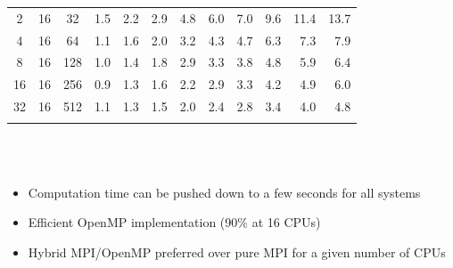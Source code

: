 \begin{frame}
\begin{table}
\begin{tabular}{cccrrrrrrrrr}
	  2& 16& 32	&  1.5 	&  2.2 	&  2.9 	&  4.8  &  6.0  &  7.0  &  9.6  & 11.4  & 13.7  \\
	  4& 16& 64	&  1.1 	&  1.6 	&  2.0 	&  3.2  &  4.3  &  4.7  &  6.3  &  7.3  &  7.9  \\
	  8& 16&128	&  1.0 	&  1.4 	&  1.8 	&  2.9  &  3.3  &  3.8  &  4.8  &  5.9  &  6.4  \\
	 16& 16&256	&  0.9 	&  1.3 	&  1.6 	&  2.2  &  2.9  &  3.3  &  4.2  &  4.9  &  6.0  \\
	 32& 16&512	&  1.1 	&  1.3 	&  1.5 	&  2.0  &  2.4  &  2.8  &  3.4  &  4.0  &  4.8  \\
	   &   &   	&      	&      	&      	&    	&    	&	&	&	&	\\
	\hline                                                                           
	\hline
    \end{tabular}
    \end{table}
    \ \\
    \ \\
    \begin{itemize}
	\item Computation time can be pushed down to a few seconds for all systems
	\item Efficient OpenMP implementation (90\% at 16 CPUs)
	\item Hybrid MPI/OpenMP preferred over pure MPI for a given number of CPUs
    \end{itemize}
\end{frame}


